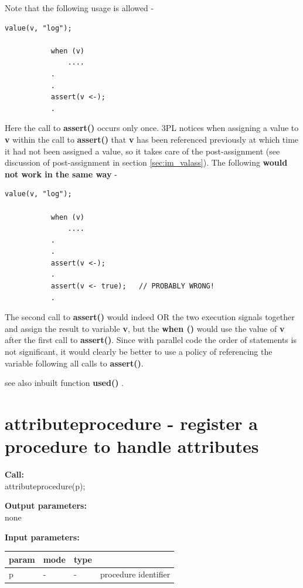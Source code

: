         Note that the following usage is allowed -
        \begin{lstlisting}[gobble=8, language=threepl]
           value(v, "log");

           when (v) 
               ....
           .
           .
           assert(v <-);
           .
        \end{lstlisting}
        Here the call to {\bf assert()} occurs only once. 3PL notices when
        assigning a value to {\bf v} within the call to {\bf assert()} that
        {\bf v} has been referenced previously at which time it had not
        been assigned a value, so it takes care of the post-assignment
        (see discussion of post-assignment in section \ref{sec:im_valass}).
        The following {\bf would not work in the same way} -
        \begin{lstlisting}[gobble=8, language=threepl]
           value(v, "log");

           when (v)
               ....
           .
           .
           assert(v <-);
           .
           assert(v <- true);   // PROBABLY WRONG!
           .
        \end{lstlisting}
        The second call to {\bf assert()} would indeed OR the two execution
        signals together and assign the result to variable {\bf v}, but the
        {\bf when ()} would use the value of {\bf v} after the first call
        to {\bf assert()}. Since with parallel code the order of statements
        is not significant, it would clearly be better to use a policy of
        referencing the variable following all calls to {\bf assert()}.

        see also inbuilt function {\bf used()} .


    \section{attributeprocedure - register a procedure to handle attributes}\label{sec:ipattributeproc}
        
        {\bf Call:} \\
        attributeprocedure(p);
        
        {\bf Output parameters:} \\
        none
        
        {\bf Input parameters:} \\
        \begin{tabular}{| l | l | l | l |}
        \hline
        param & mode & type  & \\
        \hline \hline
        p     & - &  -  & procedure identifier \\ \hline
        \end{tabular}
        

